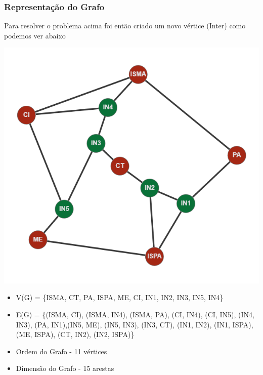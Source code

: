 \documentclass[12pt]{article}
\begin{document}
    \newpage
    
    
    \subsubsection{Representação do Grafo}
    \noindent Para resolver o problema acima foi então criado um novo vértice  (Inter) como podemos ver abaixo
    
    \begin{center}
        \includegraphics[scale=0.7]{anexos/grafoV1.png}
    \end{center}
    
    \begin{itemize}
    \item \noindent V(G) = \{ISMA, CT, PA, ISPA, ME, CI, IN1, IN2, IN3, IN5, IN4\} 
    \item \noindent E(G) = \{(ISMA, CI), (ISMA, IN4), (ISMA, PA), (CI, IN4), (CI, IN5), (IN4, IN3), (PA, IN1),(IN5, ME), (IN5, IN3), (IN3, CT), (IN1, IN2), (IN1, ISPA), (ME, ISPA), (CT, IN2), (IN2, ISPA)\}
    \item Ordem do Grafo - 11 vértices
    \item Dimensão do Grafo - 15 arestas
    \end{itemize}
    
    \newpage
    
\end{document}
